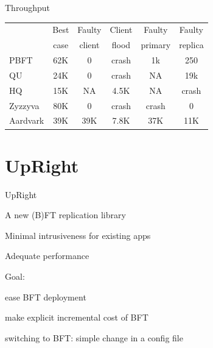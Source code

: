 \begin{frame}{Throughput}

\begin{table}	
\begin{tabular}{|l|c|c|c|c|c|}
\hline
	& Best & Faulty & Client & Faulty & Faulty \\
	& case & client & flood	& primary & replica \\ \hline
PBFT & 62K & 0 & crash & 1k & 250 \\ \hline	
QU & 24K & 0 & crash & NA & 19k \\ \hline
HQ & 15K &	NA & 4.5K &	NA & crash \\ \hline
Zyzzyva & 80K &	0 & crash & crash & 0 \\ \hline
Aardvark & 39K & 39K & 7.8K	& 37K & 11K \\ \hline
\end{tabular}	
\end{table}
\end{frame}

\section{UpRight}

\begin{frame}{UpRight}

\begin{Bib}
\end{Bib}

\BIL
\item A new (B)FT replication library
\item Minimal intrusiveness for existing apps 
\item Adequate performance 
\item Goal: 
	\BI
	\item ease BFT deployment 
	\item make explicit incremental cost of BFT 
	\item switching to BFT: simple change in a config file
	\EI
\EIL

\end{frame}

